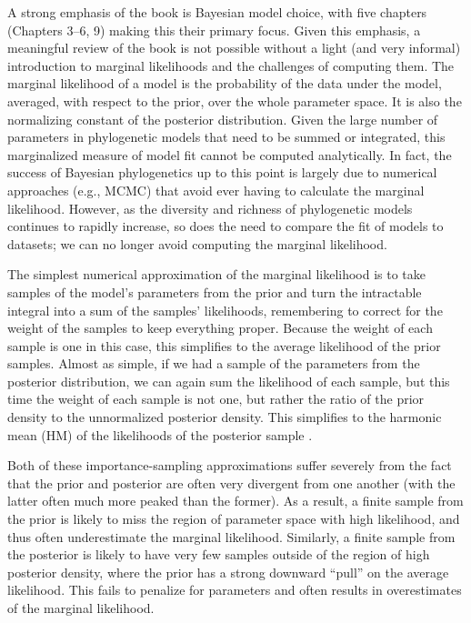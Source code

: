 \documentclass[letterpaper,12pt]{article}
\begin{document}
A strong emphasis of the book is Bayesian model choice, with five chapters
(Chapters 3--6, 9) making this their primary focus.  Given this emphasis, a
meaningful review of the book is not possible without a light (and very
informal) introduction to marginal likelihoods and the challenges of computing
them.
The marginal likelihood of a model is the probability of the data under the
model, averaged, with respect to the prior, over the whole parameter space.
It is also the normalizing constant of the posterior distribution.
Given the large number of parameters in phylogenetic models that need
to be summed or integrated, this marginalized measure of model fit cannot
be computed analytically.
In fact, the success of Bayesian phylogenetics up to this point is largely due
to numerical approaches (e.g., MCMC) that avoid ever having to calculate the
marginal likelihood.
However, as the diversity and richness of phylogenetic models continues to
rapidly increase, so does the need to compare the fit of models to datasets;
we can no longer avoid computing the marginal likelihood.

The simplest numerical approximation of the marginal likelihood is to take
samples of the model's parameters from the prior and turn the intractable
integral into a sum of the samples' likelihoods, remembering to correct for the
weight of the samples to keep everything proper. Because the weight of each
sample is one in this case, this simplifies to the average likelihood of the
prior samples.
Almost as simple, if we had a sample of the parameters from the posterior
distribution, we can again sum the likelihood of each sample, but this time the
weight of each sample is not one, but rather the ratio of the prior density to
the unnormalized posterior density.
This simplifies to the harmonic mean (HM) of the likelihoods of the posterior
sample \citep{Newton1994}.

Both of these importance-sampling approximations suffer severely from the fact
that the prior and posterior are often very divergent from one another (with
the latter often much more peaked than the former).
As a result, a finite sample from the prior is likely to miss the region of
parameter space with high likelihood, and thus often underestimate the marginal
likelihood.
Similarly, a finite sample from the posterior is likely to have very few
samples outside of the region of high posterior density, where the prior has a
strong downward ``pull'' on the average likelihood. This fails to penalize for
parameters and often results in overestimates of the marginal likelihood.
\end{document}
